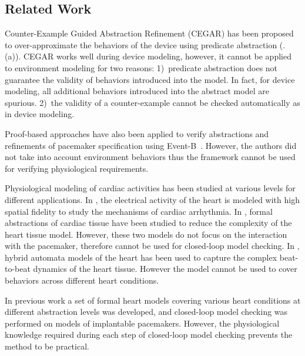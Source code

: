 \subsection{Related Work}
Counter-Example Guided Abstraction Refinement (CEGAR) \cite{CEGAR} has been proposed to over-approximate the behaviors of the device using predicate abstraction (.(a)).
CEGAR works well during device modeling, however, it cannot be applied to environment modeling for two reasons: 1)~predicate abstraction does not guarantee the validity of behaviors introduced into the model. In fact, for device modeling, all additional behaviors introduced into the abstract model are spurious. 2)~the validity of a counter-example cannot be checked automatically as in device modeling. 

Proof-based approaches have also been applied to verify  abstractions and refinements of pacemaker specification using Event-B~\cite{eventb}. However, the authors did not take into account environment behaviors thus the framework cannot be used for verifying physiological requirements.  

Physiological modeling of cardiac activities has been studied at various levels for different applications. In \cite{natalia}, the electrical activity of the heart is modeled with high spatial fidelity to study the mechanisms of cardiac arrhythmia. In \cite{radu}, formal abstractions of cardiac tissue have been studied to reduce the complexity of the heart tissue model. However, these two models do not focus on the interaction with the pacemaker, therefore cannot be used for closed-loop model checking. In \cite{marta}, hybrid automata models of the heart has been used to capture the complex beat-to-beat dynamics of the heart tissue. However the model cannot be used to cover behaviors across different heart conditions.

In previous work \cite{sttt13} a set of formal heart models covering various heart conditions at different abstraction levels was developed, and closed-loop model checking was performed on models of implantable pacemakers. 
However, the physiological knowledge required during each step of closed-loop model checking prevents the method to be practical.

